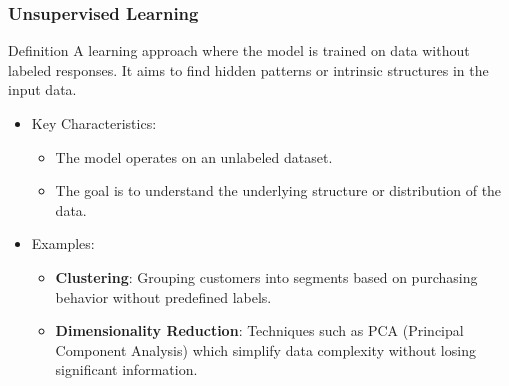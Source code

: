 \documentclass{beamer}
\begin{document}
\begin{frame}[fragile]
    \frametitle{Unsupervised Learning}
    \begin{block}{Definition}
        A learning approach where the model is trained on data without labeled responses. It aims to find hidden patterns or intrinsic structures in the input data.
    \end{block}

    \begin{itemize}
        \item Key Characteristics:
        \begin{itemize}
            \item The model operates on an unlabeled dataset.
            \item The goal is to understand the underlying structure or distribution of the data.
        \end{itemize}

        \item Examples:
        \begin{itemize}
            \item \textbf{Clustering}: Grouping customers into segments based on purchasing behavior without predefined labels.
            \item \textbf{Dimensionality Reduction}: Techniques such as PCA (Principal Component Analysis) which simplify data complexity without losing significant information.
        \end{itemize}
    \end{itemize}
\end{frame}
\end{document}
